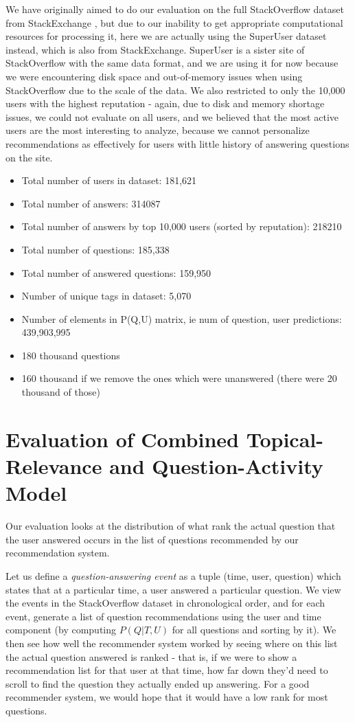 \documentclass[a4paper]{article}
\begin{document}
We have originally aimed to do our evaluation on the full StackOverflow dataset from StackExchange \cite{stackexchange}, but due to our inability to get appropriate computational resources for processing it, here we are actually using the SuperUser dataset instead, which is also from StackExchange. SuperUser is a sister site of StackOverflow with the same data format, and we are using it for now because we were encountering disk space and out-of-memory issues when using StackOverflow due to the scale of the data. We also restricted to only the 10,000 users with the highest reputation - again, due to disk and memory shortage issues, we could not evaluate on all users, and we believed that the most active users are the most interesting to analyze, because we cannot personalize recommendations as effectively for users with little history of answering questions on the site.

\begin{itemize}
\item Total number of users in dataset: 181,621
\item Total number of answers: 314087
\item Total number of answers by top 10,000 users (sorted by reputation): 218210
\item Total number of questions: 185,338
\item Total number of answered questions: 159,950
\item Number of unique tags in dataset: 5,070
\item Number of elements in P(Q,U) matrix, ie num of question, user predictions: 439,903,995
\item 180 thousand questions
\item 160 thousand if we remove the ones which were unanswered (there were 20 thousand of those)
\end{itemize}


\section{Evaluation of Combined Topical-Relevance and Question-Activity Model}

Our evaluation looks at the distribution of what rank the actual question that the user answered occurs in the list of questions recommended by our recommendation system.

Let us define a \emph{question-answering event} as a tuple (time, user, question) which states that at a particular time, a user answered a particular question. We view the events in the StackOverflow dataset in chronological order, and for each event, generate a list of question recommendations using the user and time component (by computing $P(Q|T,U)$ for all questions and sorting by it). We then see how well the recommender system worked by seeing where on this list the actual question answered is ranked - that is, if we were to show a recommendation list for that user at that time, how far down they'd need to scroll to find the question they actually ended up answering. For a good recommender system, we would hope that it would have a low rank for most questions.
\end{document}
